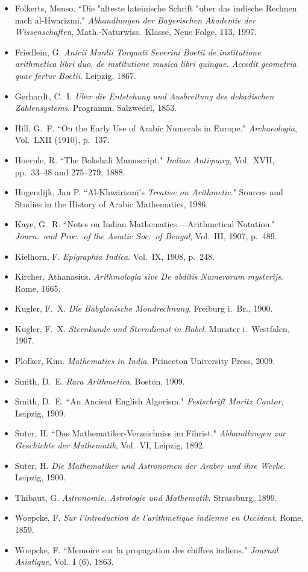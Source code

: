 \documentclass[11pt,a4paper]{article}
\begin{document}
\begin{footnotesize}
\begin{itemize}[leftmargin=2em,label={},itemsep=0.5ex]
\item Folkerts, Menso. ``Die "{a}lteste lateinische Schrift "{u}ber das indische Rechnen nach al-Hwarizmi." \textit{Abhandlungen der Bayerischen Akademie der Wissenschaften}, Math.-Naturwiss.\ Klasse, Neue Folge, 113, 1997.
\item Friedlein, G. \textit{Anicii Manlii Torquati Severini Boetii de institutione arithmetica libri duo, de institutione musica libri quinque. Accedit geometria quae fertur Boetii}. Leipzig, 1867.
\item Gerhardt, C.\ I. \textit{Uber die Entstehung und Ausbreitung des dekadischen Zahlensystems}. Programm, Salzwedel, 1853.
\item Hill, G.\ F. ``On the Early Use of Arabic Numerals in Europe." \textit{Archaeologia}, Vol.\ LXII (1910), p.\ 137.
\item Hoernle, R. ``The Bakshali Manuscript." \textit{Indian Antiquary}, Vol.\ XVII, pp.\ 33--48 and 275--279, 1888.
\item Hogendijk, Jan P. ``Al-Khw\=arizm\=i's \textit{Treatise on Arithmetic}." Sources and Studies in the History of Arabic Mathematics, 1986.
\item Kaye, G.\ R. ``Notes on Indian Mathematics.---Arithmetical Notation." \textit{Journ.\ and Proc.\ of the Asiatic Soc.\ of Bengal}, Vol.\ III, 1907, p.\ 489.
\item Kielhorn, F. \textit{Epigraphia Indica}. Vol.\ IX, 1908, p.\ 248.
\item Kircher, Athanasius. \textit{Arithmologia sive De abditis Numerorum mysterijs}. Rome, 1665.
\item Kugler, F.\ X. \textit{Die Babylonische Mondrechnung}. Freiburg i.\ Br., 1900.
\item Kugler, F.\ X. \textit{Sternkunde und Sterndienst in Babel}. Munster i.\ Westfalen, 1907.
\item Plofker, Kim. \textit{Mathematics in India}. Princeton University Press, 2009.
\item Smith, D.\ E. \textit{Rara Arithmetica}. Boston, 1909.
\item Smith, D.\ E. ``An Ancient English Algorism." \textit{Festschrift Moritz Cantor}, Leipzig, 1909.
\item Suter, H. ``Das Mathematiker-Verzeichniss im Fihrist." \textit{Abhandlungen zur Geschichte der Mathematik}, Vol.\ VI, Leipzig, 1892.
\item Suter, H. \textit{Die Mathematiker und Astronomen der Araber und ihre Werke}. Leipzig, 1900.
\item Thibaut, G. \textit{Astronomie, Astrologie und Mathematik}. Strassburg, 1899.
\item Woepcke, F. \textit{Sur l'introduction de l'arithmetique indienne en Occident}. Rome, 1859.
\item Woepcke, F. ``Memoire sur la propagation des chiffres indiens." \textit{Journal Asiatique}, Vol.\ I (6), 1863.
\end{itemize}
\end{footnotesize}
\end{document}
